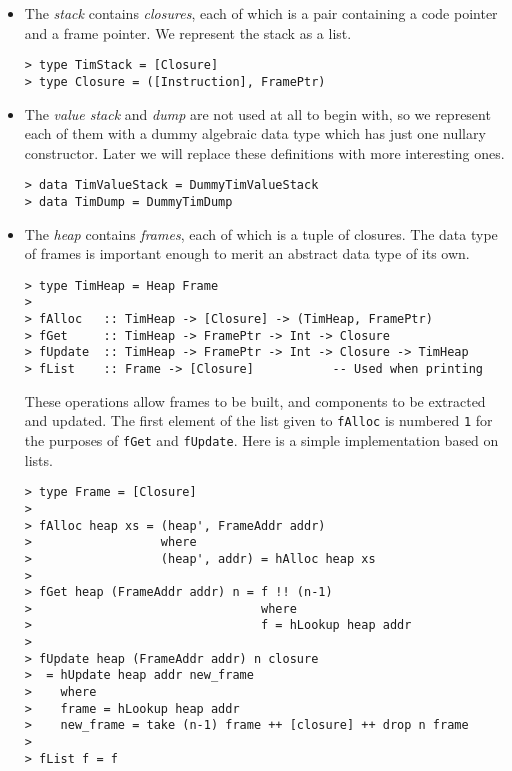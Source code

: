 \begin{itemize}
\item
The {\em stack} contains {\em closures}, each of which is a
pair containing a code pointer and a frame pointer.
We represent the stack as a list.
\begin{verbatim}
> type TimStack = [Closure]
> type Closure = ([Instruction], FramePtr)
\end{verbatim}
%
%
\item
The {\em value stack\/}
and {\em dump\/} are not used at all to begin with,
so we represent each of them with a dummy algebraic data type which has
just one nullary constructor.  Later we will replace these definitions
with more interesting ones.
\begin{verbatim}
> data TimValueStack = DummyTimValueStack
> data TimDump = DummyTimDump
\end{verbatim}
%
%
\item
The {\em heap\/} contains
{\em frames}, each of which is a tuple of closures.
The data type of frames is important enough to merit
an abstract data type of its own.
\begin{verbatim}
> type TimHeap = Heap Frame
>
> fAlloc   :: TimHeap -> [Closure] -> (TimHeap, FramePtr)
> fGet     :: TimHeap -> FramePtr -> Int -> Closure
> fUpdate  :: TimHeap -> FramePtr -> Int -> Closure -> TimHeap
> fList    :: Frame -> [Closure]           -- Used when printing
\end{verbatim}
%
%
%
%
%
These operations allow frames to be built, and components to
be extracted and updated.
The first element of the list given to \mbox{\tt fAlloc} is numbered \mbox{\tt 1} for
the purposes of \mbox{\tt fGet} and \mbox{\tt fUpdate}.
Here is a simple implementation based on lists.
\begin{verbatim}
> type Frame = [Closure]
>
> fAlloc heap xs = (heap', FrameAddr addr)
>                  where
>                  (heap', addr) = hAlloc heap xs
>
> fGet heap (FrameAddr addr) n = f !! (n-1)
>                                where
>                                f = hLookup heap addr
>
> fUpdate heap (FrameAddr addr) n closure
>  = hUpdate heap addr new_frame
>    where
>    frame = hLookup heap addr
>    new_frame = take (n-1) frame ++ [closure] ++ drop n frame
>
> fList f = f
\end{verbatim}

\end{itemize}
